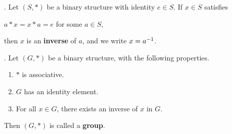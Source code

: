 .  Let \((S, *)\) be a binary structure with identity \(e \in S\). If \(x \in S\) satisfies
\begin{center}
    \(a * x = x * a = e\) for some \(a \in S\),
\end{center}
then \(x\) is an \textbf{inverse} of \(a\), and we write \(x = a^{-1}\).

.  Let \((G, *)\) be a binary structure, with the following properties.
\begin{enumerate}
    \item \(*\) is associative.
    \item \(G\) has an identity element.
    \item For all \(x \in G\), there exists an inverse of \(x\) in \(G\).
\end{enumerate}
Then \((G, *)\) is called a \textbf{group}.
\pagebreak
